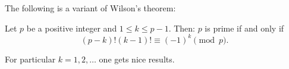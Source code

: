 \documentclass[12pt]{article}
\begin{document}
The following is a variant of Wilson's theorem:

Let $p$ be a positive integer and $1 \leq k \leq p-1$.  Then:
\newline $p$ is prime if and only if 
$$(p-k)!(k-1)! \equiv (-1)^{k} \pmod{p}.$$

For particular $k = 1, 2, \ldots$ one gets nice results.
\end{document}
